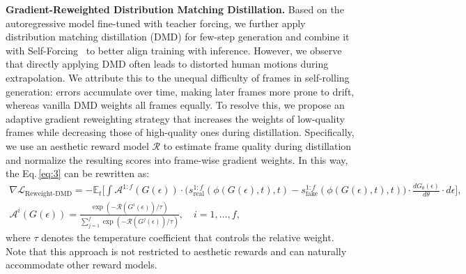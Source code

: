 \noindent
\textbf{Gradient-Reweighted Distribution Matching Distillation.}
% 
Based on the autoregressive model fine-tuned with teacher forcing, we further apply distribution matching distillation (DMD) for few-step generation and combine it with Self-Forcing~\cite{huang2025self} to better align training with inference.
%
However, we observe that directly applying DMD often leads to distorted human motions during extrapolation.
%
We attribute this to the unequal difficulty of frames in self-rolling generation: errors accumulate over time, making later frames more prone to drift, whereas vanilla DMD weights all frames equally.
%
To resolve this, we propose an adaptive gradient reweighting strategy that increases the weights of low-quality frames while decreasing those of high-quality ones during distillation.
% 
Specifically, we use an aesthetic reward model $\mathcal{R}$ to estimate frame quality during distillation and normalize the resulting scores into frame-wise gradient weights.
% 
In this way, the Eq.\,\ref{eq:3} can be rewritten as:
% 
\begin{equation}
\begin{gathered}
\nabla \mathcal{L}_{\text{Reweight-DMD}} 
= - \mathbb{E}_{t} \Biggl[
\int 
\mathcal{A}^{1:f} (G(\epsilon)) 
\cdot
\big(
s_{\text{real}}^{1:f} (\phi(G(\epsilon), t), t)
-
s_{\text{fake}}^{1:f} (\phi(G(\epsilon), t), t)
\big)
\cdot
\frac{d G_{\theta}(\epsilon)}{d\theta}
\cdot
d\epsilon
\Biggr], \\
\mathcal{A}^{i} (G(\epsilon)) = \frac{\exp(-\mathcal{R} (G^{i}(\epsilon)) / \tau)}{\sum_{j=1}^{f} \exp(-\mathcal{R} (G^{j}(\epsilon)) / \tau)}, \quad i=1, \dots, f,
\end{gathered}
\end{equation}
% 
where $\tau$ denotes the temperature coefficient that controls the relative weight. Note that this approach is not restricted to aesthetic rewards and can naturally accommodate other reward models.







